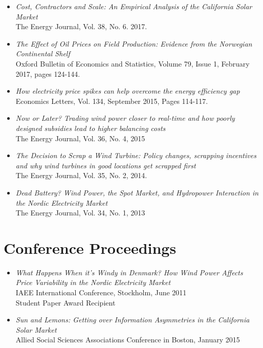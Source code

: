 \documentclass[margin]{res}
\begin{document}
\begin{resume}
\begin{itemize}
\item[] \emph{Cost, Contractors and Scale: An Empirical Analysis of the California Solar Market}  \\
The Energy Journal, Vol. 38, No. 6. 2017.

\item[] \emph{The Effect of Oil Prices on Field Production: Evidence from the Norwegian Continental Shelf}\\
Oxford Bulletin of Economics and Statistics, Volume 79, Issue 1, February 2017, pages 124-144.

\item[] \emph{How electricity price spikes can help overcome the energy efficiency gap}\\
Economics Letters, Vol. 134, September 2015, Pages 114-117.

\item[] \emph{Now or Later? Trading wind power closer to real-time and how poorly designed subsidies lead to higher balancing costs}\\
The Energy Journal, Vol. 36, No. 4, 2015

\item[] \emph{The Decision to Scrap a Wind Turbine: Policy changes, scrapping incentives and why wind turbines in good locations get scrapped first}\\
The Energy Journal, Vol. 35, No. 2, 2014.

\item[] \emph{Dead Battery? Wind Power, the Spot Market, and Hydropower Interaction in the Nordic Electricity Market}\\
The Energy Journal, Vol. 34, No. 1, 2013
\end{itemize}

\normalsize{\section{Conference Proceedings}}
\begin{itemize}
\setlength{\itemsep}{10pt}
\item[] \emph{What Happens When it's Windy in Denmark? How Wind Power Affects Price Variability in the Nordic Electricity Market}\\
IAEE International Conference, Stockholm, June 2011  \\
Student Paper Award Recipient

\item[] \emph {Sun and Lemons: Getting over Information Asymmetries in the California Solar Market} \\
Allied Social Sciences Associations Conference in Boston, January 2015


\end{itemize}
\end{resume}
\end{document}
